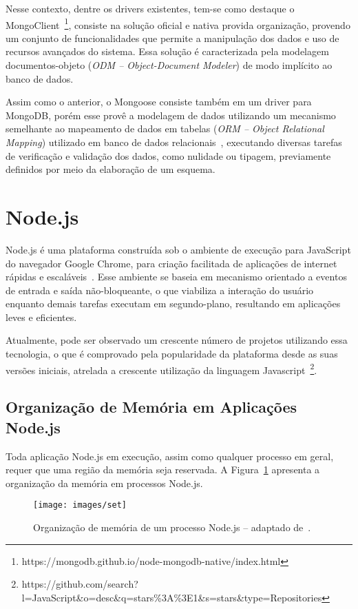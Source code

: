 \documentclass[12pt]{article}
\begin{document}
Nesse contexto, dentre os drivers existentes, tem-se como destaque o MongoClient~\footnote{https://mongodb.github.io/node-mongodb-native/index.html}, consiste na solução oficial e nativa provida organização, provendo um conjunto de funcionalidades que permite a manipulação dos dados e uso de recursos avançados do sistema. 
Essa solução é caracterizada pela modelagem documentos-objeto (\emph{ODM -- Object-Document Modeler}) de modo implícito ao banco de dados.

Assim como o anterior, o Mongoose consiste também em um driver para MongoDB, porém esse provê a modelagem de dados utilizando um mecanismo semelhante ao mapeamento de dados em tabelas (\emph{ORM -- Object Relational Mapping}) utilizado em banco de dados relacionais~\cite{mardan2014boosting}, executando diversas tarefas de verificação e validação dos dados, como nulidade ou tipagem, previamente definidos por meio da elaboração de um esquema.

\section{Node.js}
\label{section:nodejs}

Node.js é uma plataforma construída sob o ambiente de execução para JavaScript do navegador Google Chrome, para criação facilitada de aplicações de internet rápidas e escaláveis~\cite{nodejs}. 
Esse ambiente se baseia em mecanismo orientado a eventos de entrada e saída não-bloqueante, o que viabiliza a interação do usuário enquanto demais tarefas executam em segundo-plano, resultando em aplicações leves e eficientes.

Atualmente, pode ser observado um crescente número de projetos utilizando essa tecnologia, o que é comprovado pela popularidade da plataforma desde as suas versões iniciais, atrelada a crescente utilização da linguagem Javascript~\footnote{https://github.com/search?l=JavaScript\&o=desc\&q=stars\%3A\%3E1\&s=stars\&type=Repositories}.

\subsection{Organização de Memória em Aplicações Node.js}

Toda aplicação Node.js em execução, assim como qualquer processo em geral, requer que uma região da memória seja reservada. 
A Figura~\ref{figure:memoria} apresenta a organização da memória em processos Node.js.

\begin{figure}[h]
    \centering
    \texttt{[image: images/set]}
    \caption{Organização de memória de um processo Node.js -- adaptado de~\cite{nodememory}.}
    \label{figure:memoria}
\end{figure}
\end{document}
